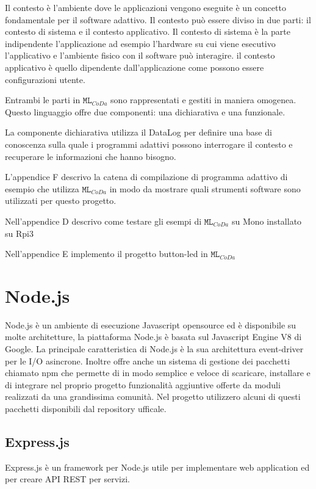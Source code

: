 Il contesto è l'ambiente dove le applicazioni vengono eseguite è un concetto fondamentale per il software adattivo. Il contesto può essere diviso in due parti: il contesto di sistema e il contesto applicativo.
Il contesto di sistema è la parte indipendente l'applicazione ad esempio l'hardware su cui viene esecutivo l'applicativo e l'ambiente fisico con il software può interagire.
il contesto applicativo è quello dipendente dall'applicazione come possono essere configurazioni utente.

Entrambi le parti in $ \texttt{ML}_{CoDa} $ sono rappresentati e gestiti in maniera omogenea. Questo linguaggio offre due componenti: una dichiarativa e una funzionale.

La componente dichiarativa  utilizza il DataLog per definire una base di conoscenza sulla quale i programmi adattivi possono interrogare il contesto e recuperare le informazioni che hanno bisogno.


L'appendice F descrivo la catena di compilazione di programma adattivo di esempio che utilizza $ \texttt{ML}_{CoDa} $ in modo da mostrare quali strumenti software sono utilizzati per questo progetto.


 
Nell'appendice D descrivo come testare gli esempi di $ \texttt{ML}_{CoDa} $ su Mono installato su Rpi3
 
Nell'appendice E implemento il progetto button-led in $ \texttt{ML}_{CoDa} $

\section{Node.js}

Node.js è un ambiente di esecuzione Javascript  opensource ed è disponibile su molte architetture, la piattaforma Node.js è basata sul Javascript Engine V8 di Google.
La principale caratteristica di Node.js è la sua  architettura event-driver per le I/O asincrone.
Inoltre offre anche un sistema di gestione dei pacchetti chiamato npm che permette di  in modo semplice e veloce di scaricare, installare e di integrare nel proprio progetto funzionalità aggiuntive offerte da moduli realizzati da una grandissima comunità.
Nel progetto utilizzero alcuni di questi pacchetti disponibili dal repository ufficale.


\subsection{Express.js}
Express.js è un framework per Node.js utile per implementare web application ed per creare API REST per servizi. 

